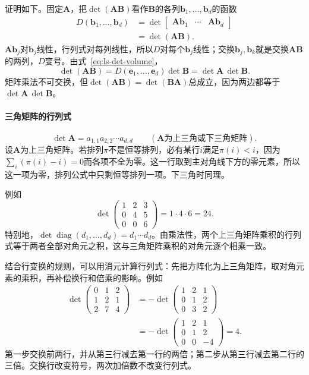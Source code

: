 证明如下。固定$\bm A$，把$\det(\bm A\bm B)$看作$\bm B$的各列$\bm b_1,\ldots,\bm b_d$的函数
\[
 \begin{aligned}
 D(\bm b_1,\ldots,\bm b_d)
 &=\det\begin{bmatrix}\bm A\bm b_1&\cdots&\bm A\bm b_d\end{bmatrix}\\
 &=\det(\bm A\bm B).
 \end{aligned}
\]
$\bm A\bm b_j$对$\bm b_j$线性，行列式对每列线性，所以$D$对每个$\bm b_j$线性；交换$\bm b_j,\bm b_k$就是交换$\bm A\bm B$的两列，$D$变号。由式~\eqref{eq:ls-det-volume}，
\[
 \det(\bm A\bm B)=D(\bm e_1,\ldots,\bm e_d)\det\bm B=\det\bm A\,\det\bm B.
\]
矩阵乘法不可交换，但$\det(\bm A\bm B)=\det(\bm B\bm A)$总成立，因为两边都等于$\det\bm A\,\det\bm B$。

\paragraph{三角矩阵的行列式}
\[
 \det\bm A=a_{1,1}a_{2,2}\cdots a_{d,d}\qquad(\bm A\text{为上三角或下三角矩阵}).
\]
设$\bm A$为上三角矩阵。若排列$\pi$不是恒等排列，必有某行$i$满足$\pi(i)<i$，因为$\sum_i(\pi(i)-i)=0$而各项不全为零。这一行取到主对角线下方的零元素，所以这一项为零，排列公式中只剩恒等排列一项。下三角时同理。

例如
\[
 \det\begin{pmatrix}1&2&3\\0&4&5\\0&0&6\end{pmatrix}=1\cdot4\cdot6=24.
\]
特别地，$\det\operatorname{diag}(d_1,\ldots,d_d)=d_1\cdots d_d$。由乘法性，两个上三角矩阵乘积的行列式等于两者全部对角元之积，这与三角矩阵乘积的对角元逐个相乘一致。

结合行变换的规则，可以用消元计算行列式：先把方阵化为上三角矩阵，取对角元素的乘积，再补偿换行和倍乘的影响。例如
\[
 \begin{aligned}
 \det\begin{pmatrix}0&1&2\\1&2&1\\2&7&4\end{pmatrix}
 &=-\det\begin{pmatrix}1&2&1\\0&1&2\\0&3&2\end{pmatrix}\\
 &=-\det\begin{pmatrix}1&2&1\\0&1&2\\0&0&-4\end{pmatrix}=4.
 \end{aligned}
\]
第一步交换前两行，并从第三行减去第一行的两倍；第二步从第三行减去第二行的三倍。交换行改变符号，两次加倍数不改变行列式。

